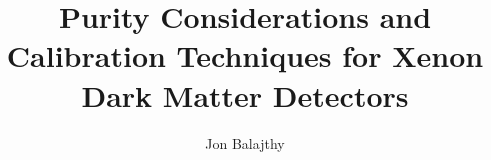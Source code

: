 \documentclass[letterpaper,12pt]{umd-thesis}
\title{Purity Considerations and Calibration Techniques for Xenon Dark Matter Detectors}
\author{Jon Balajthy}
\numberwithin{equation}{chapter}
\numberwithin{thm}{chapter}
\numberwithin{lem}{chapter}
\numberwithin{cor}{chapter}
\numberwithin{definition}{chapter}
\begin{document}
\begin{abstract}

\end{abstract} 

\begin{preliminary}

    \begin{preface}
        \lipsum[1]
    \end{preface}

    \begin{foreword}
        \lipsum[1]
    \end{foreword}


	\begin{dedication}
		
	\end{dedication}

	\begin{acknowledgements}	
		
	\end{acknowledgements}
\end{preliminary}







\appendix




\end{document}
